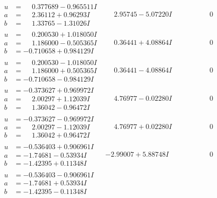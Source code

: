 \documentclass[1p]{elsarticle_modified}
\theoremstyle{definition}
\begin{document}
$$\begin{array}{c|c|c}
\begin{aligned}
u &= \phantom{-}0.377689 - 0.965511 I \\
a &= \phantom{-}2.36112 + 0.96293 I \\
b &= \phantom{-}1.33765 - 1.31026 I\end{aligned}
 & \phantom{-}2.95745 - 5.07220 I & \phantom{-0.000000 } 0 \\ \hline\begin{aligned}
u &= \phantom{-}0.200530 + 1.018050 I \\
a &= \phantom{-}1.186000 - 0.505365 I \\
b &= -0.710658 + 0.984129 I\end{aligned}
 & \phantom{-}0.36441 + 4.08864 I & \phantom{-0.000000 } 0 \\ \hline\begin{aligned}
u &= \phantom{-}0.200530 - 1.018050 I \\
a &= \phantom{-}1.186000 + 0.505365 I \\
b &= -0.710658 - 0.984129 I\end{aligned}
 & \phantom{-}0.36441 - 4.08864 I & \phantom{-0.000000 } 0 \\ \hline\begin{aligned}
u &= -0.373627 + 0.969972 I \\
a &= \phantom{-}2.00297 + 1.12039 I \\
b &= \phantom{-}1.36042 - 0.96472 I\end{aligned}
 & \phantom{-}4.76977 - 0.02280 I & \phantom{-0.000000 } 0 \\ \hline\begin{aligned}
u &= -0.373627 - 0.969972 I \\
a &= \phantom{-}2.00297 - 1.12039 I \\
b &= \phantom{-}1.36042 + 0.96472 I\end{aligned}
 & \phantom{-}4.76977 + 0.02280 I & \phantom{-0.000000 } 0 \\ \hline\begin{aligned}
u &= -0.536403 + 0.906961 I \\
a &= -1.74681 - 0.53934 I \\
b &= -1.42395 + 0.11348 I\end{aligned}
 & -2.99007 + 5.88748 I & \phantom{-0.000000 } 0 \\ \hline\begin{aligned}
u &= -0.536403 - 0.906961 I \\
a &= -1.74681 + 0.53934 I \\
b &= -1.42395 - 0.11348 I\end{aligned}

\end{array}$$
\end{document}
